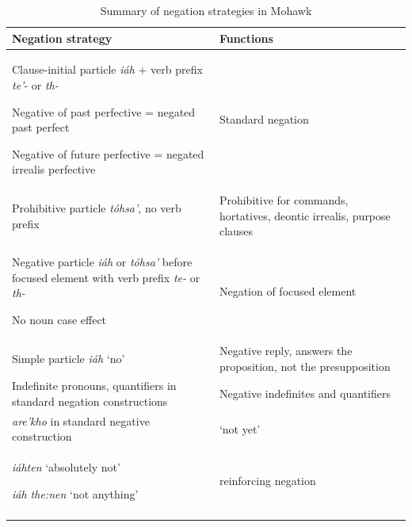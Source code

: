 \documentclass[output=paper,colorlinks,citecolor=brown]{langscibook}
\begin{document}
\begin{table}
    \centering\small 
    \begin{tabularx}{\textwidth}{p{70mm}p{50mm}}
\lsptoprule    
Negation strategy & Functions \\
 \midrule
Clause-initial particle \textit{iáh} + verb prefix \textit{te’}- or \textit{th-}			

  Negative of past perfective = negated past perfect 

  Negative of future perfective = negated irrealis perfective 
& Standard negation \\
 \tablevspace
Prohibitive particle \textit{tóhsa’}, no verb prefix
& Prohibitive for commands, hortatives, deontic irrealis, purpose clauses \\
 \tablevspace
Negative particle \textit{iáh} or \textit{tóhsa’} before focused element with verb prefix \textit{te-} or \textit{th-} 

  No noun case effect 
& Negation of focused element \\
 \tablevspace
Simple particle \textit{iáh} ‘no’	
& Negative reply, answers the proposition, not the presupposition \\
 \tablevspace
Indefinite pronouns, quantifiers in standard negation constructions 
& Negative indefinites and quantifiers \\
 \tablevspace
\textit{are’kho} in standard negative construction
& ‘not yet’ \\
 \tablevspace
\textit{iáhten} ‘absolutely not’ 

\textit{iáh the:nen} ‘not anything’
& reinforcing negation \\
\lspbottomrule
    \end{tabularx}
    \caption{Summary of negation strategies in Mohawk}
    \label{tab:moh:3}
\end{table}


\clearpage 
\end{document}
